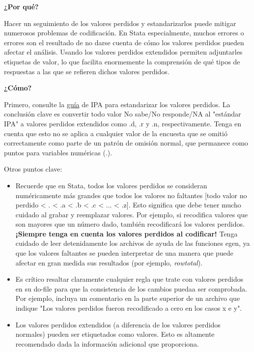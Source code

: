 \documentclass[11pt,en]{elegantpaper}
\begin{document}
\noindent
\textbf{¿Por qué?}

Hacer un seguimiento de los valores perdidos y estandarizarlos puede mitigar numerosos problemas de codificación. En Stata especialmente, muchos errores o errores son el resultado de no darse cuenta de cómo los valores perdidos pueden afectar el análisis. Usando los valores perdidos extendidos permiten adjuntarles etiquetas de valor, lo que facilita enormemente la comprensión de qué tipos de respuestas a las que se refieren dichos valores perdidos. 

\noindent
\textbf{¿Cómo?}

Primero, consulte la \href{http://www.poverty-action.org/research-transparency/standardizing-missing-values}{guía} de IPA para estandarizar los valores perdidos. La conclusión clave es convertir todo valor No sabe/No responde/NA al "estándar IPA" a valores perdidos extendidos como .d, .r y .n, respectivamente. Tenga en cuenta que esto no se aplica a cualquier valor de la encuesta que se omitió correctamente como parte de un patrón de omisión normal, que permanece como puntos para variables numéricas (.).

Otros puntos clave:

\begin{itemize}
	\item  Recuerde que en Stata, todos los valores perdidos se consideran numéricamente más grandes que todos los valores no faltantes [todo valor no perdido < . < .a < .b < .c < ... < .z]. Esto significa que debe tener mucho cuidado al grabar y reemplazar valores. Por ejemplo, si recodifica valores que son mayores que un número dado, también recodificará los valores perdidos. \textbf{¡Siempre tenga en cuenta los valores perdidos al codificar!} Tenga cuidado de leer detenidamente los archivos de ayuda de las funciones egen, ya que los valores faltantes se pueden interpretar de una manera que puede afectar en gran medida sus resultados (por ejemplo, \textit{rowtotal}).
	
	\item  Es crítico resaltar claramente cualquier regla que trate con valores perdidos en su do-file para que la consistencia de los cambios puedaa ser comprobada. Por ejemplo, incluya un comentario en la parte superior de un archivo que indique "Los valores perdidos fueron recodificado a cero en los casos x e y".
	
	\item  Los valores perdidos extendidos (a diferencia de los valores perdidos normales) pueden ser etiquetados como valores. Esto es altamente recomendado dada la información adicional que proporciona.
\end{itemize}
\end{document}
